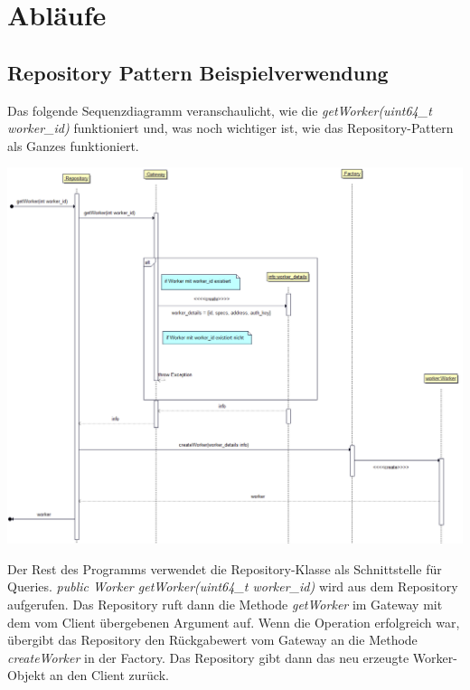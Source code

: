 \documentclass[a4paper,12pt]{article}
\begin{document}
\clearpage

\section{Abläufe}
\subsection{Repository Pattern Beispielverwendung}

Das folgende Sequenzdiagramm veranschaulicht, wie die \textit{getWorker(uint64\_t worker\_id)} funktioniert und, was noch wichtiger ist, wie das Repository-Pattern als Ganzes funktioniert.

\includegraphics[width=\textwidth]{repository_sequence_diagram}

Der Rest des Programms verwendet die Repository-Klasse als Schnittstelle für Queries. \textit{public Worker getWorker(uint64\_t worker\_id)} wird aus dem Repository aufgerufen. Das Repository ruft dann die Methode \textit{getWorker} im Gateway mit dem vom Client übergebenen Argument auf. Wenn die Operation erfolgreich war, übergibt das Repository den Rückgabewert vom Gateway an die Methode \textit{createWorker} in der Factory. Das Repository gibt dann das neu erzeugte Worker-Objekt an den Client zurück.

\printnoidxglossaries
\end{document}
